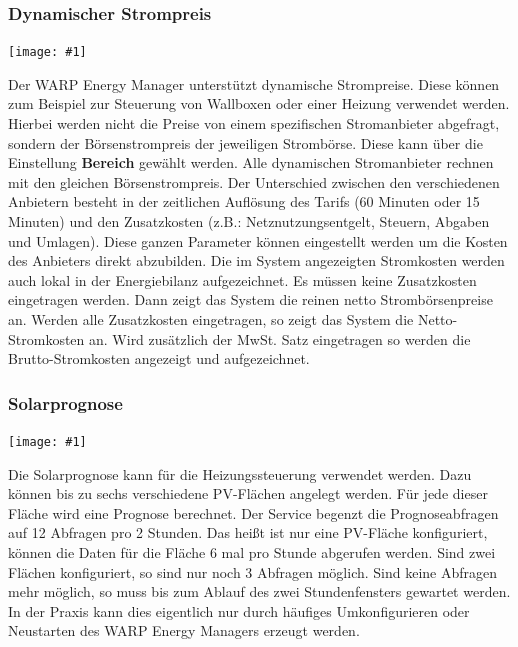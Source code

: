 \documentclass[a4paper,10pt]{article}
\newcommand{\gfx}[1]{\texttt{[image: \#1]}}
\begin{document}
\begin{multicols*}{2}
    \subsubsection{Dynamischer Strompreis}

	\gfx{./img_v2/wem2-web-dyn-price}

    Der WARP Energy Manager unterstützt dynamische Strompreise. Diese können zum Beispiel zur Steuerung von Wallboxen oder einer Heizung verwendet werden.
    Hierbei werden nicht die Preise von einem spezifischen Stromanbieter abgefragt, sondern der Börsenstrompreis der jeweiligen Strombörse.
    Diese kann über die Einstellung \textbf{Bereich} gewählt werden. Alle dynamischen Stromanbieter rechnen mit den gleichen Börsenstrompreis. Der Unterschied zwischen den verschiedenen Anbietern besteht 
    in der zeitlichen Auflösung des Tarifs (60 Minuten oder 15 Minuten) und den Zusatzkosten (z.B.: Netznutzungsentgelt, Steuern, Abgaben und Umlagen). Diese ganzen Parameter können eingestellt werden um
    die Kosten des Anbieters direkt abzubilden. Die im System angezeigten Stromkosten werden auch lokal in der Energiebilanz aufgezeichnet. Es müssen keine Zusatzkosten eingetragen werden. 
    Dann zeigt das System die reinen netto Strombörsenpreise an. Werden alle Zusatzkosten eingetragen, so zeigt das System die Netto-Stromkosten an. Wird zusätzlich der MwSt. Satz eingetragen so
    werden die Brutto-Stromkosten angezeigt und aufgezeichnet.
    
       
    
    \subsubsection{Solarprognose}

	\gfx{./img_v2/wem2-web-pv-prognosis}

    Die Solarprognose kann für die Heizungssteuerung verwendet werden. Dazu können bis zu sechs verschiedene PV-Flächen angelegt werden. Für jede dieser Fläche wird eine Prognose berechnet.
    Der Service begenzt die Prognoseabfragen auf 12 Abfragen pro 2 Stunden. Das heißt ist nur eine PV-Fläche konfiguriert, können die Daten für die Fläche 6 mal pro Stunde abgerufen werden.
    Sind zwei Flächen konfiguriert, so sind nur noch 3 Abfragen möglich. Sind keine Abfragen mehr möglich, so muss bis zum Ablauf des zwei Stundenfensters gewartet werden. In der Praxis kann dies eigentlich nur 
    durch häufiges Umkonfigurieren oder Neustarten des WARP Energy Managers erzeugt werden.



\end{multicols*}
\end{document}

